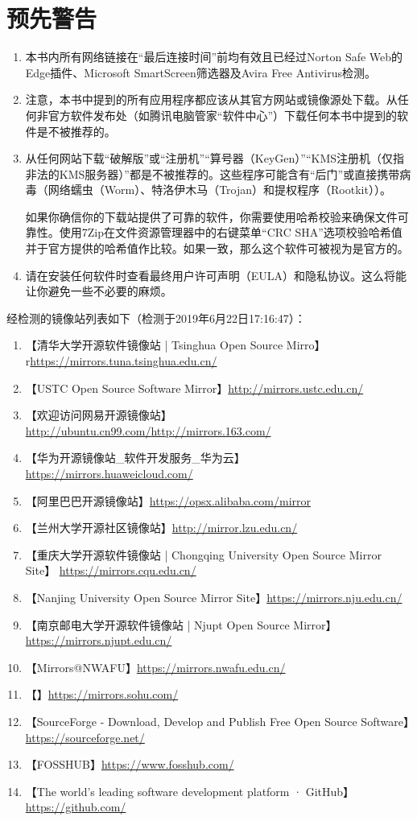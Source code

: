 \chapter{预先警告}
\begin{enumerate}
\item 本书内所有网络链接在“最后连接时间”前均有效且已经过Norton Safe Web的Edge插件、Microsoft SmartScreen筛选器及Avira Free Antivirus检测。 
\item 注意，本书中提到的所有应用程序都应该从其官方网站或镜像源处下载。从任何非官方软件发布处（如腾讯电脑管家“软件中心”）下载任何本书中提到的软件是不被推荐的。\par 
\item 从任何网站下载“破解版”或“注册机”“算号器（KeyGen）”“KMS注册机（仅指非法的KMS服务器）”都是不被推荐的。这些程序可能含有“后门”或直接携带病毒（网络蠕虫（Worm）、特洛伊木马（Trojan）和提权程序（Rootkit）\cite{HR1}\cite{HR2}\cite{HR3}\cite{HR4}\cite{HR5}）。\par
如果你确信你的下载站提供了可靠的软件，你需要使用哈希校验来确保文件可靠性。使用7Zip在文件资源管理器中的右键菜单“CRC SHA”选项校验哈希值并于官方提供的哈希值作比较。如果一致，那么这个软件可被视为是官方的。
\item 请在安装任何软件时查看最终用户许可声明（EULA）和隐私协议。这么将能让你避免一些不必要的麻烦。
\end{enumerate}
经检测的镜像站列表如下（检测于2019年6月22日17:16:47）：
\begin{enumerate}
	\item 【清华大学开源软件镜像站 | Tsinghua Open Source Mirro】r\url{https://mirrors.tuna.tsinghua.edu.cn/}
	\item 【USTC Open Source Software Mirror】\url{http://mirrors.ustc.edu.cn/}
	\item 【欢迎访问网易开源镜像站】\url{http://ubuntu.cn99.com/}\url{http://mirrors.163.com/}
	\item 【华为开源镜像站\_软件开发服务\_华为云】\url{https://mirrors.huaweicloud.com/}
	\item 【阿里巴巴开源镜像站】\url{https://opsx.alibaba.com/mirror}
	\item 【兰州大学开源社区镜像站】\url{http://mirror.lzu.edu.cn/}
	\item 【重庆大学开源软件镜像站 | Chongqing University Open Source Mirror Site】 \url{https://mirrors.cqu.edu.cn/}
	\item 【Nanjing University Open Source Mirror Site】\url{https://mirrors.nju.edu.cn/}
	\item 【南京邮电大学开源软件镜像站 | Njupt Open Source Mirror】\url{https://mirrors.njupt.edu.cn/}
	\item 【Mirrors@NWAFU】\url{https://mirrors.nwafu.edu.cn/}
	\item 【】\url{https://mirrors.sohu.com/}
	\item 【SourceForge - Download, Develop and Publish Free Open Source Software】\url{https://sourceforge.net/}
	\item 【FOSSHUB】\url{https://www.fosshub.com/}
	\item 【The world's leading software development platform · GitHub】\url{https://github.com/}
\end{enumerate}
